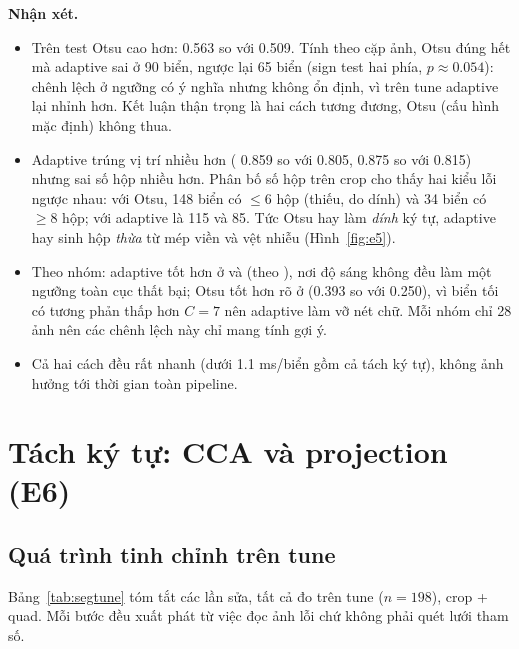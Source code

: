 \textbf{Nhận xét.}
\begin{itemize}
  \item Trên test Otsu cao hơn:  0.563 so với 0.509. Tính theo cặp ảnh, Otsu đúng hết mà adaptive sai ở 90 biển, ngược lại 65 biển (sign test hai phía, $p\approx 0.054$): chênh lệch ở ngưỡng có ý nghĩa nhưng không ổn định, vì trên tune adaptive lại nhỉnh hơn. Kết luận thận trọng là hai cách tương đương, Otsu (cấu hình mặc định) không thua.
  \item Adaptive trúng vị trí nhiều hơn ( 0.859 so với 0.805,  0.875 so với 0.815) nhưng sai số hộp nhiều hơn. Phân bố số hộp trên crop  cho thấy hai kiểu lỗi ngược nhau: với Otsu, 148 biển có $\le 6$ hộp (thiếu, do dính) và 34 biển có $\ge 8$ hộp; với adaptive là 115 và 85. Tức Otsu hay làm \emph{dính} ký tự, adaptive hay sinh hộp \emph{thừa} từ mép viền và vệt nhiễu (Hình~\ref{fig:e5}).
  \item Theo nhóm: adaptive tốt hơn ở  và  (theo ), nơi độ sáng không đều làm một ngưỡng toàn cục thất bại; Otsu tốt hơn rõ ở  (0.393 so với 0.250), vì biển tối có tương phản thấp hơn $C=7$ nên adaptive làm vỡ nét chữ. Mỗi nhóm chỉ 28 ảnh nên các chênh lệch này chỉ mang tính gợi ý.
  \item Cả hai cách đều rất nhanh (dưới 1.1 ms/biển gồm cả tách ký tự), không ảnh hưởng tới thời gian toàn pipeline.
\end{itemize}

\section{Tách ký tự: CCA và projection (E6)}
\label{sec:e6}

\subsection{Quá trình tinh chỉnh trên tune}
\label{sec:segtune}

Bảng~\ref{tab:segtune} tóm tắt các lần sửa, tất cả đo trên tune ($n=198$), crop  + quad. Mỗi bước đều xuất phát từ việc đọc ảnh lỗi chứ không phải quét lưới tham số.


